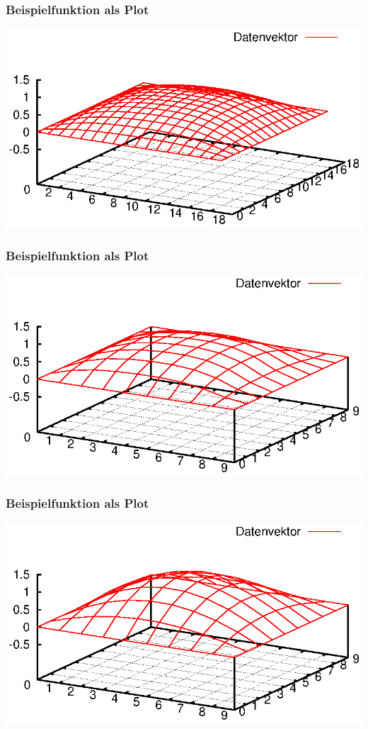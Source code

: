 \documentclass{beamer}
\begin{document}
\begin{frame}\frametitle{Beispielfunktion als Plot}\includegraphics[width=\textwidth]{plots/003}\end{frame}
\begin{frame}\frametitle{Beispielfunktion als Plot}\includegraphics[width=\textwidth]{plots/004}\end{frame}
\begin{frame}\frametitle{Beispielfunktion als Plot}\includegraphics[width=\textwidth]{plots/005}\end{frame}
\end{document}

